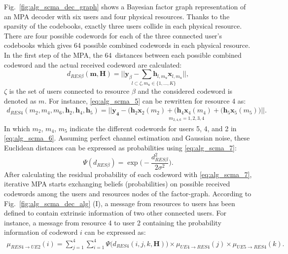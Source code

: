 Fig.~\ref{fig:alg_scma_dec_graph} shows a Bayesian factor graph representation
of an MPA decoder with six users and four physical resources. Thanks to the
sparsity of the codebooks, exactly three users collide in each physical
resource. There are four possible codewords for each of the three connected
user's codebooks which gives 64 possible combined codewords in each physical
resource. In the first step of the MPA, the 64~distances between each possible
combined codeword and the actual received codeword are calculated:
\begin{equation}
  \label{eq:alg_scma_5}
  d_{RES  \beta}(\bm{m}, \bm{H}) =
  \underset{l \subset \zeta, m_u\in\{1,...,K\}}{||\bm{y}_\beta -
  \sum \bm{h}_{l,m_u} \bm{x}_{l,m_u} ||},
\end{equation}
$\zeta$ is the set of users connected to resource $\beta$ and the
considered codeword is denoted as $m$. For instance, \eqref{eq:alg_scma_5} can
be rewritten for resource 4 as:
\begin{equation}
  \label{eq:alg_scma_6}
  \begin{split}
  d_{RES 4}(m_2,m_4,m_6,\bm{h}_2, \bm{h}_4, \bm{h}_5) =
  \underset{m_{2,4,6}=1,2,3,4}{|| \bm{y_4} - \Big(\bm{h}_2\bm{x}_2(m_2) +
  (\bm{h}_4\bm{x}_4(m_4) + (\bm{h}_5\bm{x}_5(m_5) \Big) ||}.
  \end{split}
\end{equation}
In which $m_2$, $m_4$, $m_5$ indicate the different codewords for users 5, 4,
and 2 in \eqref{eq:alg_scma_6}. Assuming perfect channel estimation and Gaussian
noise, these Euclidean distances can be expressed as probabilities using
\eqref{eq:alg_scma_7}:
\begin{equation}
  \label{eq:alg_scma_7}
  \Psi(d_{RES \beta}) = \exp \Bigg(-\frac{d_{RES \beta}^2}{2\sigma^2} \Bigg).
\end{equation}
After calculating the residual probability of each codeword with
\eqref{eq:alg_scma_7}, iterative MPA starts exchanging beliefs (probabilities)
on possible received codewords among the users and resources nodes of the
factor-graph. According to Fig.~\ref{fig:alg_scma_dec_alg} (I), a message from
resources to users has been defined to contain extrinsic information of two
other connected users. For instance, a message from resource 4 to user 2
containing the probability information of codeword $i$ can be expressed as:
\begin{equation}
  \label{eq:alg_scma_8}
  \begin{split}
  \mu_{RES4 \rightarrow UE2}(i) = \sum\limits_{j=1}^4 \sum\limits_{i=1}^4 \Psi
  \Big(d_{RES4}(i,j,k,\bm{H}) \Big)
  \times \mu_{UE4 \rightarrow RES4}(j) \times \mu_{UE5 \rightarrow RES4}(k).
  \end{split}
\end{equation}
